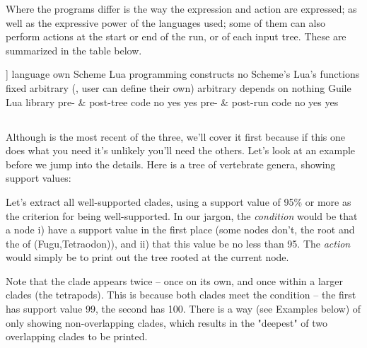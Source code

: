 Where the programs differ is the way the expression and action are expressed; as
well as the expressive power of the languages used; some of them can also
perform actions at the start or end of the run, or of each input tree. These are
summarized in the table below.

\startalignment[center]
		\starttabulate[|l|l|l|l|]]
		\NC \NC \ed \NC \sched \NC \luaed \NC\NR
		\HL
		\NC language 								\NC own 		\NC Scheme 		\NC Lua \NC\NR
		\NC programming constructs 	\NC no 			\NC Scheme's 	\NC Lua's \NC\NR
		\NC functions 							\NC fixed		\NC arbitrary (\ie, user can define their own) \NC arbitrary \NC\NR
		\NC depends on 							\NC nothing \NC \gnu{} Guile \NC Lua library \NC\NR
		\NC pre- \& post-tree code 	\NC no 			\NC yes 			\NC yes \NC\NR
		\NC pre- \& post-run code 	\NC no 			\NC yes 			\NC yes \NC\NR
		\stoptabulate
\stopalignment

\subsection[sct:luaed]{\luaed}


Although \luaed{} is the most recent of the three, we'll cover it first because
if this one does what you need it's unlikely you'll need the others.  Let's look
at an example before we jump into the details. Here is a tree of vertebrate
genera, showing support values:

\startalignment[center]
\externalfigure[ed_1_svg]
\stopalignment

Let's extract all well-supported clades, using a support value of
95\% or more as the criterion for being well-supported. In our jargon, the
{\em condition} would be that a node i) have a support value in the first place
(some nodes don't, \eg{} the root and the \lca{} of (Fugu,Tetraodon)), and ii)
that this value be no less than 95. The {\em action} would simply be to print
out the tree rooted at the current node.

\page[no]


Note that the  clade appears twice -- once on
its own, and once within a larger clades (the tetrapods). This is because both
clades meet the condition -- the first has support value 99, the second has 100.
There is a way (see Examples below) of only showing non-overlapping clades,
which results in the "deepest" of two overlapping clades to be printed.

